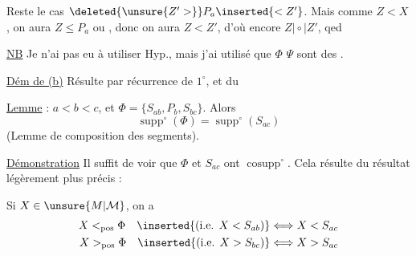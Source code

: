 Reste le cas $\deleted{\unsure{Z'>}}P_a\inserted{<Z'}$. Mais comme $Z<X$, on aura $Z\leq P_a$ ou , donc on aura $Z<Z'$, d'où encore $Z\mathrel{\mid\circ\mid}Z'$, qed

\uline{NB} Je n'ai pas eu à utiliser Hyp.,  mais  j'ai utilisé  que $\Phi$ $\Psi$ sont des .

\uline{Dém de (b)} Résulte par récurrence  de $1^{\circ}$, et du 

\uline{Lemme} :  $a<b<c$, et $\Phi=\{S_{ab},P_b,S_{bc}\}$. Alors
\[
\operatorname{supp}^{\circ}(\Phi)=\operatorname{supp}^{\circ}(S_{ac})
\]
(Lemme de composition des segments).

\uline{Démonstration} Il suffit de voir que $\Phi$ et $S_{ac}$ ont  $\operatorname{cosupp}^{\circ}$.  Cela résulte du résultat légèrement plus  précis :

Si $X\in\unsure{M|\mathcal{M}}$, on a
\[
\begin{aligned}
X<_{\mathrm{pos}}\Phi\quad\inserted{\text{(i.e. }X<S_{ab}\text{)}}&\Longleftrightarrow X<S_{ac}\\
X>_{\mathrm{pos}}\Phi\quad\inserted{\text{(i.e. }X>S_{bc}\text{)}}&\Longleftrightarrow X>S_{ac}
\end{aligned}
\]
